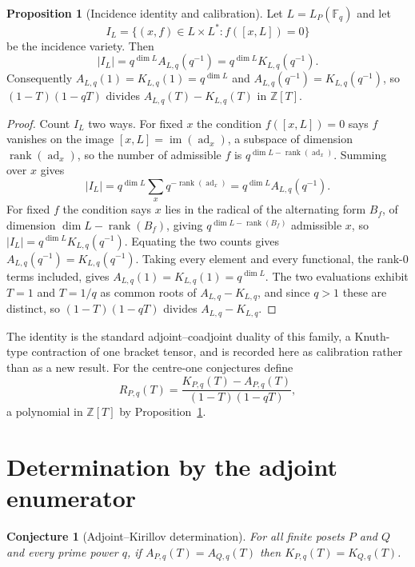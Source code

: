 \documentclass[11pt]{article}
\newtheorem{conjecture}{Conjecture}
\theoremstyle{definition}
\newcommand{\rank}{\operatorname{rank}}
\newcommand{\Fq}{\mathbb F}
\newcommand{\Z}{\mathbb Z}
\providecommand{\Z}{\mathbb Z}
\newtheorem{proposition}{Proposition}
\begin{document}
\begin{proposition}[Incidence identity and calibration]\label{v:calib}
Let $L=L_P(\Fq_q)$ and let
\[
I_L=\{(x,f)\in L\times L^*:f([x,L])=0\}
\]
be the incidence variety.  Then
\[
|I_L|=q^{\dim L}A_{L,q}(q^{-1})=q^{\dim L}K_{L,q}(q^{-1}).
\]
Consequently $A_{L,q}(1)=K_{L,q}(1)=q^{\dim L}$ and $A_{L,q}(q^{-1})=K_{L,q}(q^{-1})$, so $(1-T)(1-qT)$ divides $A_{L,q}(T)-K_{L,q}(T)$ in $\Z[T]$.
\end{proposition}

\begin{proof}
Count $I_L$ two ways.  For fixed $x$ the condition $f([x,L])=0$ says $f$ vanishes on the image $[x,L]=\operatorname{im}(\operatorname{ad}_x)$, a subspace of dimension $\rank(\operatorname{ad}_x)$, so the number of admissible $f$ is $q^{\dim L-\rank(\operatorname{ad}_x)}$.  Summing over $x$ gives
\[
|I_L|=q^{\dim L}\sum_x q^{-\rank(\operatorname{ad}_x)}=q^{\dim L}A_{L,q}(q^{-1}).
\]
For fixed $f$ the condition says $x$ lies in the radical of the alternating form $B_f$, of dimension $\dim L-\rank(B_f)$, giving $q^{\dim L-\rank(B_f)}$ admissible $x$, so $|I_L|=q^{\dim L}K_{L,q}(q^{-1})$.  Equating the two counts gives $A_{L,q}(q^{-1})=K_{L,q}(q^{-1})$.  Taking every element and every functional, the rank-$0$ terms included, gives $A_{L,q}(1)=K_{L,q}(1)=q^{\dim L}$.  The two evaluations exhibit $T=1$ and $T=1/q$ as common roots of $A_{L,q}-K_{L,q}$, and since $q>1$ these are distinct, so $(1-T)(1-qT)$ divides $A_{L,q}-K_{L,q}$.
\end{proof}

The identity is the standard adjoint--coadjoint duality of this family, a Knuth-type contraction of one bracket tensor, and is recorded here as calibration rather than as a new result.  For the centre-one conjectures define
\[
R_{P,q}(T)=\frac{K_{P,q}(T)-A_{P,q}(T)}{(1-T)(1-qT)},
\]
a polynomial in $\Z[T]$ by Proposition~\ref{v:calib}.

\section{Determination by the adjoint enumerator}

\begin{conjecture}[Adjoint--Kirillov determination]\label{v1}
For all finite posets $P$ and $Q$ and every prime power $q$, if $A_{P,q}(T)=A_{Q,q}(T)$ then $K_{P,q}(T)=K_{Q,q}(T)$.
\end{conjecture}
\end{document}
